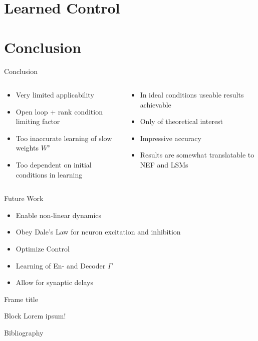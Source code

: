 \documentclass[17pt, t, lualatex]{beamer}
\begin{document}
\section{Learned Control}\insertsectionpage



\section{Conclusion}\insertsectionpage
\begin{frame}{Conclusion}
	\begin{columns}
		\begin{column}{0.45\textwidth}
			\begin{itemize}
				\setlength\itemsep{1.0em}
				\item Very limited applicability
				\item Open loop + rank condition limiting factor
				\item Too inaccurate learning of slow weights $W^s$
				\item Too dependent on initial conditions in learning
			\end{itemize}
		\end{column}
		\vrule
		\begin{column}{0.45\textwidth}
			\begin{itemize}
				\setlength\itemsep{1.0em}
				\item In ideal conditions useable results achievable
				\item Only of theoretical interest
				\item Impressive accuracy
				\item Results are somewhat translatable to NEF and LSMs
			\end{itemize}
		\end{column}
	\end{columns}
\end{frame}




\begin{frame}{Future Work}
	\pause
	\begin{itemize}[<+->]
		\setlength\itemsep{1.5em}
		\item Enable non-linear dynamics
		\item Obey Dale's Law for neuron excitation and inhibition
		\item Optimize Control
		\item Learning of En- and Decoder $\Gamma$
		\item Allow for synaptic delays
	\end{itemize}
\end{frame}


\begin{frame}{Frame title}
\begin{block}{Block}
Lorem ipsum!
\end{block}
\end{frame}



\begin{frame}{Bibliography}
	\printbibliography
\end{frame}


\insertendpage
\end{document}
